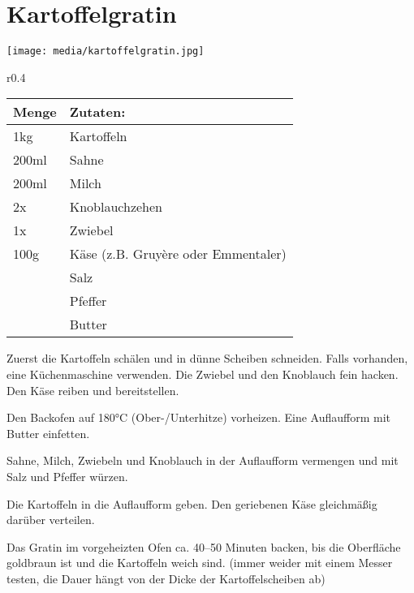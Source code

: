 \documentclass[../../book.tex]{subfiles}
\begin{document}
\section{Kartoffelgratin}

\begin{figure*}[h]
  \centering
  \texttt{[image: media/kartoffelgratin.jpg]}
\end{figure*}

\begin{wraptable}{r}{0.4\textwidth}
  \centering
  \begin{tabularx}{0.39\textwidth}{|l|X|}
    \toprule
    Menge & Zutaten: \\
    \midrule
    1kg & Kartoffeln \\
    \midrule
    200ml & Sahne \\
    \midrule
    200ml & Milch \\
    \midrule
    2x & Knoblauchzehen \\
    \midrule
    1x & Zwiebel \\
    \midrule
    100g & Käse (z.B. Gruyère oder Emmentaler) \\
    \midrule
    & Salz \\
    \midrule
    & Pfeffer \\
    \midrule
    & Butter \\
    \bottomrule
  \end{tabularx}
\end{wraptable}

Zuerst die Kartoffeln schälen und in dünne Scheiben schneiden. Falls vorhanden, eine Küchenmaschine verwenden. Die Zwiebel und den Knoblauch fein hacken. Den Käse reiben und bereitstellen.

Den Backofen auf 180°C (Ober-/Unterhitze) vorheizen. Eine Auflaufform mit Butter einfetten.

Sahne, Milch, Zwiebeln und Knoblauch in der Auflaufform vermengen und mit Salz und Pfeffer würzen.

Die Kartoffeln in die Auflaufform geben. Den geriebenen Käse gleichmäßig darüber verteilen.

Das Gratin im vorgeheizten Ofen ca. 40–50 Minuten backen, bis die Oberfläche goldbraun ist und die Kartoffeln weich sind. (immer weider mit einem Messer testen, die Dauer hängt von der Dicke der Kartoffelscheiben ab)

\newpage
\end{document}
